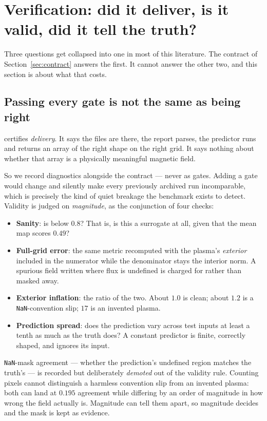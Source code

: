 \section{Verification: did it deliver, is it valid, did it tell the truth?}
\label{sec:verification}

Three questions get collapsed into one in most of this literature. The contract
of Section~\ref{sec:contract} answers the first. It cannot answer the other
two, and this section is about what that costs.

\subsection{Passing every gate is not the same as being right}
\label{sec:validity}

 certifies \emph{delivery}. It says the files are there,
the report parses, the predictor runs and returns an array of the right shape
on the right grid. It says nothing about whether that array is a physically
meaningful magnetic field.

So we record diagnostics alongside the contract --- never as gates. Adding a
gate would change  and silently make every previously
archived run incomparable, which is precisely the kind of quiet breakage the
benchmark exists to detect. Validity is judged on \emph{magnitude}, as the
conjunction of four checks:

\begin{itemize}
\item \textbf{Sanity}: is \relltwo{} below $0.8$? That is, is this a surrogate
  at all, given that the mean map scores $0.49$?
\item \textbf{Full-grid error}: the same metric recomputed with the plasma's
  \emph{exterior} included in the numerator while the denominator stays the
  interior norm. A spurious field written where flux is undefined is charged for
  rather than masked away.
\item \textbf{Exterior inflation}: the ratio of the two. About $1.0$ is clean;
  about $1.2$ is a \texttt{NaN}-convention slip; $17$ is an invented plasma.
\item \textbf{Prediction spread}: does the prediction vary across test inputs at
  least a tenth as much as the truth does? A constant predictor is finite,
  correctly shaped, and ignores its input.
\end{itemize}

\texttt{NaN}-mask agreement --- whether the prediction's undefined region
matches the truth's --- is recorded but deliberately \emph{demoted} out of the
validity rule. Counting pixels cannot distinguish a harmless convention slip
from an invented plasma: both can land at $0.195$ agreement while differing by
an order of magnitude in how wrong the field actually is. Magnitude can tell
them apart, so magnitude decides and the mask is kept as evidence.

